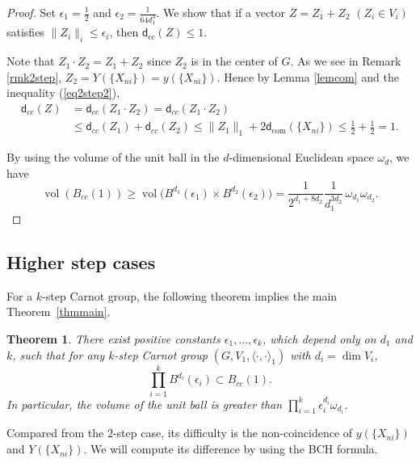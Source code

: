 \documentclass[pdftex]{sigma}
\numberwithin{equation}{section}
\newtheorem{Theorem}{Theorem}[section]
\begin{document}
\begin{proof}
Set $\epsilon_1=\frac{1}{2}$ and $\epsilon_2=\frac{1}{64d_1^3}$.
We show that if a vector $Z=Z_1+Z_2$ $(Z_i\in V_i)$ satisfies $\|Z_i\|_i\leq \epsilon_i$,
then $\mathsf{d}_{cc}(Z)\leq 1$.

Note that $Z_1\cdot Z_2=Z_1+Z_2$ since $Z_2$ is in the center of $G$.
As we see in Remark \ref{rmk2step},
$Z_2=Y(\{X_{ni}\})=y\left(\{X_{ni}\}\right)$.
Hence by Lemma \ref{lemcom} and the inequality (\ref{eq2step2}),
\begin{align*}
 \mathsf{d}_{cc}(Z)&=\mathsf{d}_{cc}(Z_1\cdot Z_2)
=\mathsf{d}_{cc}(Z_1\cdot Z_2)
\\
 &\leq \mathsf{d}_{cc}(Z_1)+\mathsf{d}_{cc}(Z_2)
\leq \|Z_1\|_1+2\mathsf{d}_{\mathrm{com}}(\{X_{ni}\})
 \leq \frac{1}{2}+\frac{1}{2}=1.
\end{align*}

By using the volume of the unit ball in the $d$-dimensional Euclidean space $\omega_d$,
we have
\[
\operatorname{vol}(B_{cc}(1))\geq \operatorname{vol}\big(B^{d_1}(\epsilon_1)\times B^{d_2}(\epsilon_2)\big)=\frac{1}{2^{d_1+8d_2}}\frac{1}{d_1^{3d_2}}\,\omega_{d_1}\omega_{d_2}.\tag*{\qed}
\]
\renewcommand{\qed}{}
\end{proof}

\subsection{Higher step cases}
For a $k$-step Carnot group,
the following theorem implies the
 main Theorem~\ref{thmmain}.
\begin{Theorem}\label{propmain}
 There exist positive constants $\epsilon_1,\dots,\epsilon_k$,
 which depend only on $d_1$ and $k$,
 such that for any $k$-step Carnot group $(G,V_1,\langle\cdot,\cdot\rangle_1)$ with $d_i=\dim V_i$,
 \[\prod_{i=1}^kB^{d_i}(\epsilon_i)\subset B_{cc}(1).\]
 In particular,
 the volume of the unit ball is greater than $\prod_{i=1}^k\epsilon_i^{d_i}\omega_{d_i}$.
\end{Theorem}

Compared from the $2$-step case,
its difficulty is the non-coincidence of $y(\{X_{ni}\})$ and $Y(\{X_{ni}\})$.
We will compute its difference by using the BCH formula.
\end{document}
